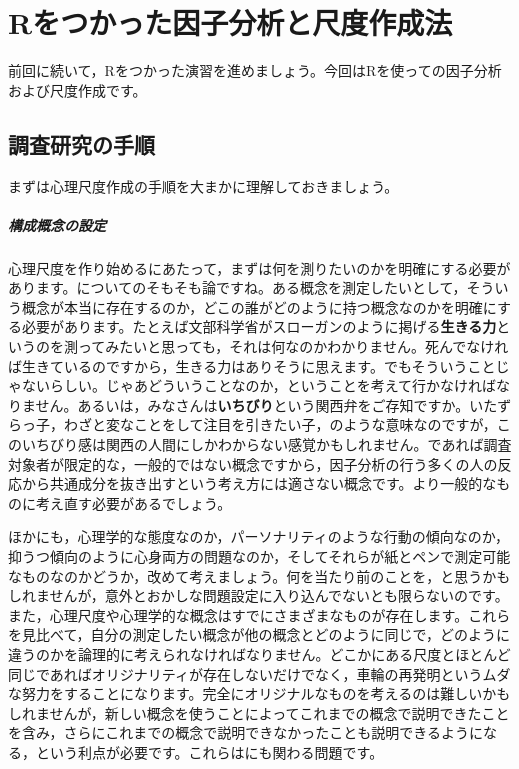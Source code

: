\documentclass{ltjsbook}
\begin{document}
\chapter{Rをつかった因子分析と尺度作成法}
\label{x10_FA}
前回に続いて，Rをつかった演習を進めましょう。今回はRを使っての因子分析および尺度作成です。

\section{調査研究の手順}
まずは心理尺度作成の手順を大まかに理解しておきましょう。

\paragraph{構成概念の設定}心理尺度を作り始めるにあたって，まずは何を測りたいのかを明確にする必要があります。についてのそもそも論ですね。ある概念を測定したいとして，そういう概念が本当に存在するのか，どこの誰がどのように持つ概念なのかを明確にする必要があります。たとえば文部科学省がスローガンのように掲げる\textbf{生きる力}というのを測ってみたいと思っても，それは何なのかわかりません。死んでなければ生きているのですから，生きる力はありそうに思えます。でもそういうことじゃないらしい。じゃあどういうことなのか，ということを考えて行かなければなりません。あるいは，みなさんは\textbf{いちびり}という関西弁をご存知ですか。いたずらっ子，わざと変なことをして注目を引きたい子，のような意味なのですが，このいちびり感は関西の人間にしかわからない感覚かもしれません。であれば調査対象者が限定的な，一般的ではない概念ですから，因子分析の行う多くの人の反応から共通成分を抜き出すという考え方には適さない概念です。より一般的なものに考え直す必要があるでしょう。

ほかにも，心理学的な態度なのか，パーソナリティのような行動の傾向なのか，抑うつ傾向のように心身両方の問題なのか，そしてそれらが紙とペンで測定可能なものなのかどうか，改めて考えましょう。何を当たり前のことを，と思うかもしれませんが，意外とおかしな問題設定に入り込んでないとも限らないのです。また，心理尺度や心理学的な概念はすでにさまざまなものが存在します。これらを見比べて，自分の測定したい概念が他の概念とどのように同じで，どのように違うのかを論理的に考えられなければなりません。どこかにある尺度とほとんど同じであればオリジナリティが存在しないだけでなく，車輪の再発明というムダな努力をすることになります。完全にオリジナルなものを考えるのは難しいかもしれませんが，新しい概念を使うことによってこれまでの概念で説明できたことを含み，さらにこれまでの概念で説明できなかったことも説明できるようになる，という利点が必要です。これらはにも関わる問題です。
\end{document}
